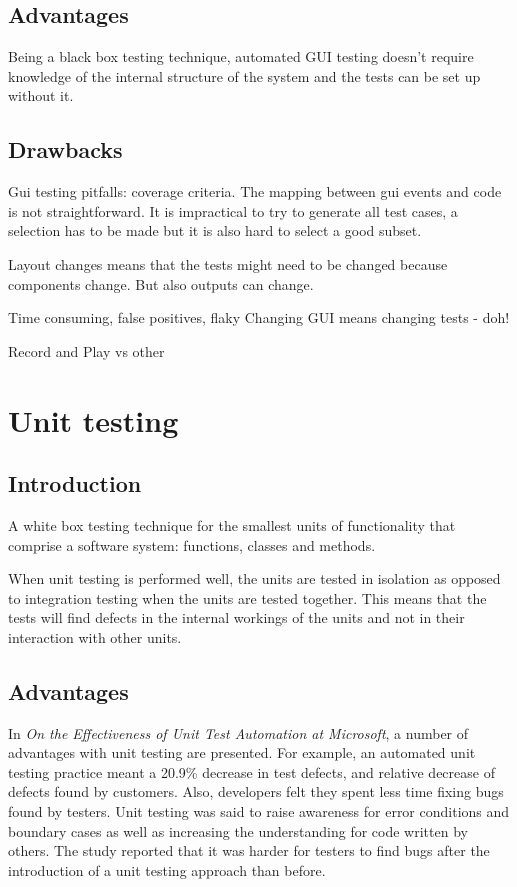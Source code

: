 \documentclass{article}
\begin{document}
		\subsection{Advantages}
		Being a black box testing technique, automated GUI testing doesn't require knowledge of the internal structure of the system and the tests can be set up without it.

		\subsection{Drawbacks}
		Gui testing pitfalls: coverage criteria. The mapping between gui events and code is not straightforward. It is impractical to try to generate all test cases, a selection has to be made but it is also hard to select a good subset. \cite{pitfalls}

		Layout changes means that the tests might need to be changed because components change. But also outputs can change. \cite{pitfalls}

		Time consuming, false positives, flaky
		Changing GUI means changing tests - doh!

		Record and Play vs other

	\section{Unit testing}
		\subsection{Introduction}
		A white box testing technique for the smallest units of functionality that comprise a software system: functions, classes and methods. 

		When unit testing is performed well, the units are tested in isolation as opposed to integration testing when the units are tested together. This means that the tests will find defects in the internal workings of the units and not in their interaction with other units.

		\subsection{Advantages}
		In \textit{On the Effectiveness of Unit Test Automation at Microsoft}, a number of advantages with unit testing are presented. For example, an automated unit testing practice meant a 20.9\% decrease in test defects, and relative decrease of defects found by customers. Also, developers felt they spent less time fixing bugs found by testers. Unit testing was said to raise awareness for error conditions and boundary cases as well as increasing the understanding for code written by others. The study reported that it was harder for testers to find bugs after the introduction of a unit testing approach than before. \cite{unit}
\end{document}
